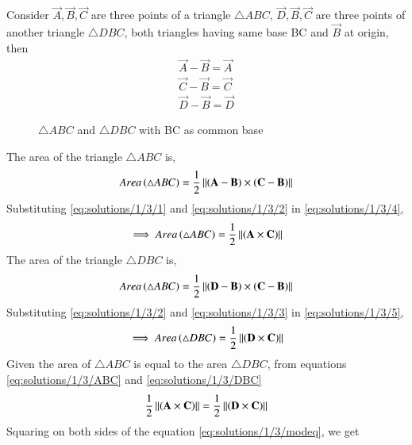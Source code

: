  Consider $\vec{A},\vec{B},\vec{C}$ are three points of a triangle $\triangle ABC$, $\vec{D}, \vec{B}, \vec{C}$ are three points of another triangle $\triangle DBC$, both triangles having same base BC and $\vec{B}$ at origin, then
\begin{align}
    \label{eq:solutions/1/3/1}
    \vec{A}-\vec{B}=\vec{A}\\
    \label{eq:solutions/1/3/2}
    \vec{C}-\vec{B}=\vec{C}\\
    \label{eq:solutions/1/3/3}
    \vec{D}-\vec{B}=\vec{D}
\end{align}
\renewcommand{\thefigure}{1}
\begin{figure}[!ht]
\centering
\resizebox{\columnwidth}{!}{}
\caption{$\triangle ABC$ and $\triangle DBC$ with BC as common base}
\label{eq:solutions/1/3/fig:1.2}
\end{figure}
The area of the triangle $\triangle ABC$ is,
\begin{align}
    \label{eq:solutions/1/3/4}
    Area\left(\triangle ABC\right) = \frac{1}{2}\left\lVert\left(\mathbf{A} - \mathbf{B}\right) \times \left(\mathbf{C} - \mathbf{B}\right)\right\rVert
\end{align}
Substituting \eqref{eq:solutions/1/3/1} and \eqref{eq:solutions/1/3/2} in \eqref{eq:solutions/1/3/4}, 
\begin{align}
    \label{eq:solutions/1/3/ABC}
    \implies Area\left(\triangle ABC\right) = \frac{1}{2}\left\lVert\left(\mathbf{A} \times \mathbf{C}\right)\right\rVert
\end{align}
The area of the triangle $\triangle DBC$ is,
\begin{align}
    \label{eq:solutions/1/3/5}
    Area\left(\triangle ABC\right) = \frac{1}{2}\left\lVert\left(\mathbf{D} - \mathbf{B}\right) \times \left(\mathbf{C} - \mathbf{B}\right)\right\rVert
\end{align}   
Substituting \eqref{eq:solutions/1/3/2} and \eqref{eq:solutions/1/3/3} in \eqref{eq:solutions/1/3/5}, 
\begin{align}
    \label{eq:solutions/1/3/DBC}
    \implies Area\left(\triangle DBC\right) = \frac{1}{2}\left\lVert\left(\mathbf{D} \times \mathbf{C}\right)\right\rVert
\end{align}
Given the area of $\triangle ABC$ is equal to the area $\triangle DBC$, from equations \eqref{eq:solutions/1/3/ABC} and \eqref{eq:solutions/1/3/DBC}
\begin{align}
    \label{eq:solutions/1/3/modeq}
    \frac{1}{2}\left\lVert\left(\mathbf{A} \times \mathbf{C}\right)\right\rVert = \frac{1}{2}\left\lVert\left(\mathbf{D} \times \mathbf{C}\right)\right\rVert
\end{align}
Squaring on both sides of the equation \eqref{eq:solutions/1/3/modeq}, we get
